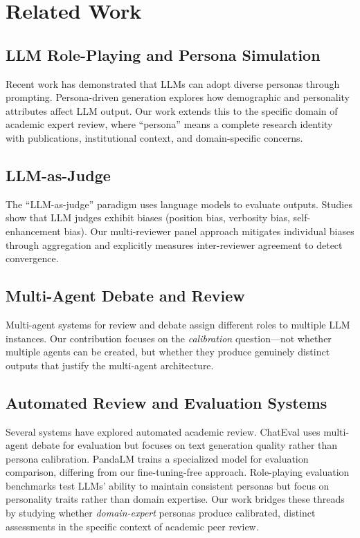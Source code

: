 \section{Related Work}

\subsection{LLM Role-Playing and Persona Simulation}

Recent work has demonstrated that LLMs can adopt diverse personas through prompting. Persona-driven generation explores how demographic and personality attributes affect LLM output. Our work extends this to the specific domain of academic expert review, where ``persona'' means a complete research identity with publications, institutional context, and domain-specific concerns.

\subsection{LLM-as-Judge}

The ``LLM-as-judge'' paradigm uses language models to evaluate outputs. Studies show that LLM judges exhibit biases (position bias, verbosity bias, self-enhancement bias). Our multi-reviewer panel approach mitigates individual biases through aggregation and explicitly measures inter-reviewer agreement to detect convergence.

\subsection{Multi-Agent Debate and Review}

Multi-agent systems for review and debate assign different roles to multiple LLM instances. Our contribution focuses on the \emph{calibration} question---not whether multiple agents can be created, but whether they produce genuinely distinct outputs that justify the multi-agent architecture.

\subsection{Automated Review and Evaluation Systems}

Several systems have explored automated academic review. ChatEval uses multi-agent debate for evaluation but focuses on text generation quality rather than persona calibration. PandaLM trains a specialized model for evaluation comparison, differing from our fine-tuning-free approach. Role-playing evaluation benchmarks test LLMs' ability to maintain consistent personas but focus on personality traits rather than domain expertise. Our work bridges these threads by studying whether \emph{domain-expert} personas produce calibrated, distinct assessments in the specific context of academic peer review.

